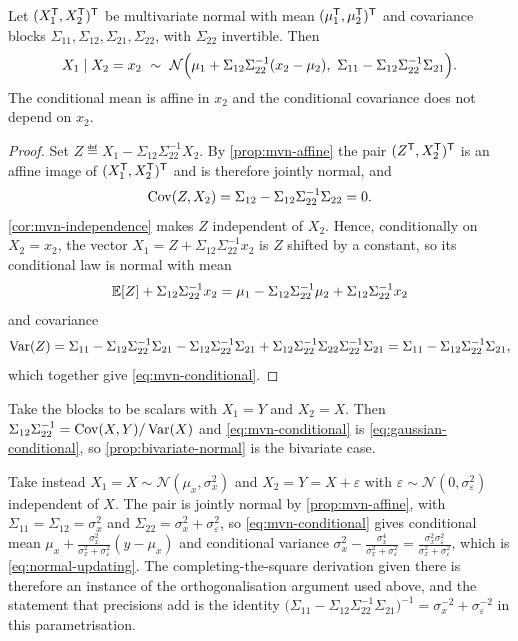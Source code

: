 \begin{theorem}\label{thm:mvn-conditional}
	Let $(X_1^{\mathsf{T}},X_2^{\mathsf{T}})^{\mathsf{T}}$ be multivariate normal with mean
	$(\mu_1^{\mathsf{T}},\mu_2^{\mathsf{T}})^{\mathsf{T}}$ and covariance blocks
	$\Sigma_{11},\Sigma_{12},\Sigma_{21},\Sigma_{22}$, with $\Sigma_{22}$
	invertible. Then
	\begin{equation}\label{eq:mvn-conditional}
		X_1\mid X_2=x_2\ \sim\
		\mathcal{N}\Bigl(\mu_1+\Sigma_{12}\Sigma_{22}^{-1}(x_2-\mu_2),\
		\Sigma_{11}-\Sigma_{12}\Sigma_{22}^{-1}\Sigma_{21}\Bigr).
	\end{equation}
	The conditional mean is affine in $x_2$ and the conditional covariance does not
	depend on $x_2$.
\end{theorem}

\begin{proof}
	Set $Z\eqdef X_1-\Sigma_{12}\Sigma_{22}^{-1}X_2$. By \autoref{prop:mvn-affine}
	the pair $(Z^{\mathsf{T}},X_2^{\mathsf{T}})^{\mathsf{T}}$ is an affine image of
	$(X_1^{\mathsf{T}},X_2^{\mathsf{T}})^{\mathsf{T}}$ and is therefore jointly normal, and
	\[
		\operatorname{Cov}(Z,X_2)=\Sigma_{12}-\Sigma_{12}\Sigma_{22}^{-1}\Sigma_{22}=0 .
	\]
	\autoref{cor:mvn-independence} makes $Z$ independent of $X_2$. Hence,
	conditionally on $X_2=x_2$, the vector
	$X_1=Z+\Sigma_{12}\Sigma_{22}^{-1}x_2$ is $Z$ shifted by a constant, so its
	conditional law is normal with mean
	\[
		\mathbb{E}[Z]+\Sigma_{12}\Sigma_{22}^{-1}x_2
		=\mu_1-\Sigma_{12}\Sigma_{22}^{-1}\mu_2+\Sigma_{12}\Sigma_{22}^{-1}x_2
	\]
	and covariance
	\[
		\operatorname{Var}(Z)=\Sigma_{11}-\Sigma_{12}\Sigma_{22}^{-1}\Sigma_{21}
		-\Sigma_{12}\Sigma_{22}^{-1}\Sigma_{21}
		+\Sigma_{12}\Sigma_{22}^{-1}\Sigma_{22}\Sigma_{22}^{-1}\Sigma_{21}
		=\Sigma_{11}-\Sigma_{12}\Sigma_{22}^{-1}\Sigma_{21},
	\]
	which together give \eqref{eq:mvn-conditional}.
\end{proof}

\begin{remark}
	\label{rem:mvn-specialisation}
	Take the blocks to be scalars with $X_1=Y$ and $X_2=X$. Then
	$\Sigma_{12}\Sigma_{22}^{-1}=\operatorname{Cov}(X,Y)/\operatorname{Var}(X)$ and
	\eqref{eq:mvn-conditional} is \eqref{eq:gaussian-conditional}, so
	\autoref{prop:bivariate-normal} is the bivariate case.

	Take instead $X_1=X\sim\mathcal{N}(\mu_x,\sigma_x^{2})$ and
	$X_2=Y=X+\varepsilon$ with
	$\varepsilon\sim\mathcal{N}(0,\sigma_\varepsilon^{2})$ independent of $X$. The
	pair is jointly normal by \autoref{prop:mvn-affine}, with
	$\Sigma_{11}=\Sigma_{12}=\sigma_x^{2}$ and
	$\Sigma_{22}=\sigma_x^{2}+\sigma_\varepsilon^{2}$, so
	\eqref{eq:mvn-conditional} gives conditional mean
	$\mu_x+\frac{\sigma_x^{2}}{\sigma_x^{2}+\sigma_\varepsilon^{2}}(y-\mu_x)$ and
	conditional variance
	$\sigma_x^{2}-\frac{\sigma_x^{4}}{\sigma_x^{2}+\sigma_\varepsilon^{2}}
		=\frac{\sigma_x^{2}\sigma_\varepsilon^{2}}
		{\sigma_x^{2}+\sigma_\varepsilon^{2}}$, which is
	\eqref{eq:normal-updating}. The completing-the-square derivation given there is
	therefore an instance of the orthogonalisation argument used above, and the
	statement that precisions add is the identity
	$\bigl(\Sigma_{11}-\Sigma_{12}\Sigma_{22}^{-1}\Sigma_{21}\bigr)^{-1}
		=\sigma_x^{-2}+\sigma_\varepsilon^{-2}$ in this parametrisation.
\end{remark}
